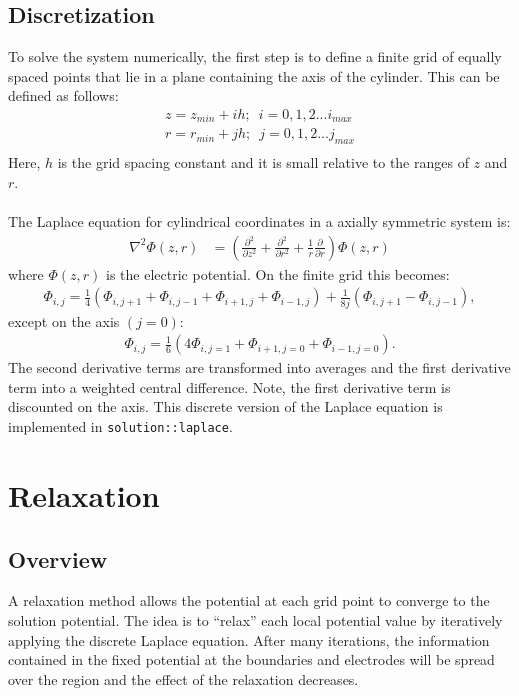 \documentclass[12pt]{article}
\newcommand{\secpd}[1]{\frac{\partial^2}{\partial #1^2}}
\newcommand{\pd}[1]{\frac{\partial}{\partial #1}}
\begin{document}
\subsection{Discretization}
To solve the system numerically, the first step is to define a finite grid of equally spaced points that lie in a plane containing the axis of the cylinder. This can be defined as follows:
\begin{align*}
z = z_{min} + ih;\,\,\,i = 0, 1, 2 ... i_{max} \\
r = r_{min} + jh;\,\,\,j = 0, 1, 2 ... j_{max} \\
\end{align*}
Here, $h$ is the grid spacing constant and it is small relative to the ranges of $z$ and $r$. \\ \\
The Laplace equation for cylindrical coordinates in a axially symmetric system is:
\begin{align*}
\nabla^2 \Phi(z, r) &= \left(\secpd{z} + \secpd{r} + \frac{1}{r}\pd{r} \right) \Phi(z, r)
\end{align*}
where $\Phi(z, r)$ is the electric potential. On the finite grid this becomes:
\begin{align*}
\Phi_{i, j} = \frac{1}{4}\left(\Phi_{i, j + 1} + \Phi_{i, j - 1} + \Phi_{i + 1, j} + \Phi_{i - 1, j}\right) + \frac{1}{8j}\left(\Phi_{i, j + 1} - \Phi_{i, j-1}\right),
\end{align*}
except on the axis $(j = 0)$:
\begin{align*}
\Phi_{i, j} = \frac{1}{6}\left(4\Phi_{i, j=1} + \Phi_{i+1, j = 0} + \Phi_{i-1, j=0}\right).
\end{align*}
The second derivative terms are transformed into averages and the first derivative term into a weighted central difference. Note, the first derivative term is discounted on the axis. This discrete version of the Laplace equation is implemented in \texttt{solution::laplace}.
\section{Relaxation}
\subsection{Overview}
A relaxation method allows the potential at each grid point to converge to the solution potential. The idea is to ``relax'' each local potential value by iteratively applying the discrete Laplace equation. After many iterations, the information contained in the fixed potential at the boundaries and electrodes will be spread over the region and the effect of the relaxation decreases.
\end{document}
